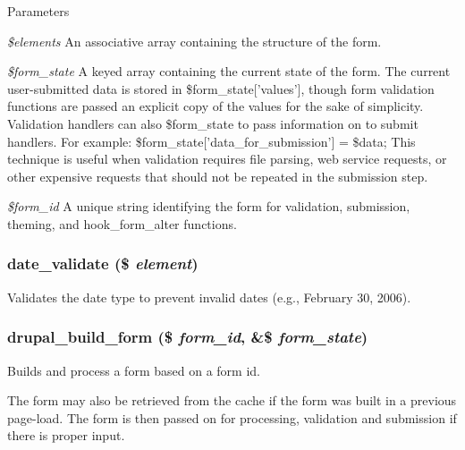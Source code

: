 \begin{DoxyParams}{Parameters}
\item[{\em \$elements}]An associative array containing the structure of the form. \item[{\em \$form\_\-state}]A keyed array containing the current state of the form. The current user-\/submitted data is stored in \$form\_\-state\mbox{[}'values'\mbox{]}, though form validation functions are passed an explicit copy of the values for the sake of simplicity. Validation handlers can also \$form\_\-state to pass information on to submit handlers. For example: \$form\_\-state\mbox{[}'data\_\-for\_\-submission'\mbox{]} = \$data; This technique is useful when validation requires file parsing, web service requests, or other expensive requests that should not be repeated in the submission step. \item[{\em \$form\_\-id}]A unique string identifying the form for validation, submission, theming, and hook\_\-form\_\-alter functions. \end{DoxyParams}
\hypertarget{group__form__api_ga2a44cde876324e1333edb5fda5799c83}{
\subsubsection[{date\_\-validate}]{\setlength{\rightskip}{0pt plus 5cm}date\_\-validate (\$ {\em element})}}
\label{group__form__api_ga2a44cde876324e1333edb5fda5799c83}
Validates the date type to prevent invalid dates (e.g., February 30, 2006). \hypertarget{group__form__api_gabead4b3c089fd605421d371a0315c4d7}{
\subsubsection[{drupal\_\-build\_\-form}]{\setlength{\rightskip}{0pt plus 5cm}drupal\_\-build\_\-form (\$ {\em form\_\-id}, \/  \&\$ {\em form\_\-state})}}
\label{group__form__api_gabead4b3c089fd605421d371a0315c4d7}
Builds and process a form based on a form id.

The form may also be retrieved from the cache if the form was built in a previous page-\/load. The form is then passed on for processing, validation and submission if there is proper input.



